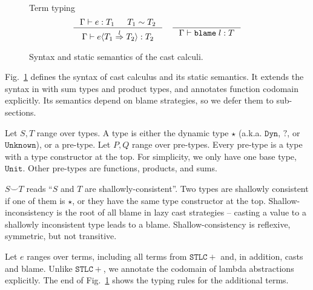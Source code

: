 \documentclass[acmsmall,review,anonymous]{acmart}\settopmatter{printfolios=true,printccs=false,printacmref=false}
\newcommand{\figref}[1]{Fig.~\ref{#1}}
\newcommand{\judgetype}[3]{#1 \vdash #2 : #3}
\newcommand{\POOunit}[0]{\mathtt{Unit}}
\newcommand{\eOOcast}[4]{#1 \langle \cOOcast{#2}{#3}{#4} \rangle}
\newcommand{\eOOblame}[1]{\mathtt{blame} \; #1}
\newcommand{\cOOcast}[3]{#1 \overset{#2}{\Rightarrow} #3}
\newcommand{\todoKCFixed}[0]{\todo[inline]{Fixed. -KC}}
\begin{document}
\begin{figure}
	Term typing
	\fbox{$ \judgetype{\Gamma}{e}{T} $}
	\begin{gather*}
		\inference{
			\Gamma \vdash e : T_1 & T_1 \sim T_2
		}{
			\judgetype{\Gamma}{\eOOcast{e}{T_1}{l}{T_2}}{T_2}
		} \quad
		\inference{
		}{
			\judgetype{\Gamma}{\eOOblame{l}}{T}
		}
	\end{gather*}
	
	\caption{Syntax and static semantics of the cast calculi.}
	\label{fig:blame-static}
\end{figure}

\figref{fig:blame-static} defines the syntax of cast calculus and its
static semantics. It extends the syntax in \citet{siek2009exploring} with sum 
types and product types, and annotates function codomain explicitly. 
Its semantics depend on blame strategies, so we defer them to sub-sections.
\todoKCFixed{}
\todoKCFixed{}
 
Let $ S,T $ range over types. A type is either the dynamic type $ \star $
(a.k.a. $ \mathtt{Dyn} $, $ \mathbb{?} $, or $ \mathtt{Unknown} $), 
or a pre-type. 
Let $ P,Q $ range over pre-types. Every pre-type is a type with a type 
constructor at the top. For simplicity, we only have one base type, $ \POOunit 
$. 
Other pre-types are functions, products, and sums.


$ S \smile T $ reads ``$ S $ and $ T $ are shallowly-consistent''. Two types 
are shallowly consistent if one of them is $ \star $, or they have the same 
type constructor at the top. Shallow-inconsistency is the root of all blame in 
lazy cast strategies -- casting a value to a shallowly inconsistent type leads 
to a blame. Shallow-consistency is reflexive, symmetric, but 
not transitive.

Let $ e $ ranges over terms, including all terms from $ \mathtt{STLC+} $ and, 
in addition, casts and blame. Unlike $ \mathtt{STLC+} $, we annotate the 
codomain of lambda abstractions explicitly.
The end of \figref{fig:blame-static} shows the typing rules for the
additional terms.
\end{document}
